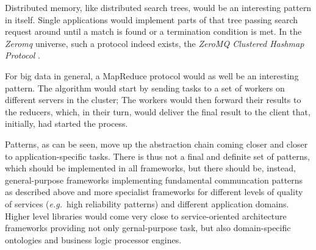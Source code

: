 \documentclass[a4paper]{scrartcl}
\newcommand\eg{\textit{e.g.}}
\newcommand{\term}[1]{\emph{#1}}
\newcommand{\connect}[2]{
\draw [->,color=black] (#1) to (#2)
}
\newcommand{\ancor}[2]{
\draw [-,color=green!30!black] (#1) to (#2)
}
\begin{document}
Distributed memory, like distributed search trees,
would be an interesting pattern in itself.
Single applications would implement parts of that tree
passing search request around until a match is found
or a termination condition is met.
In the \term{Zeromq} universe, such a protocol indeed exists,
the \term{ZeroMQ Clustered Hashmap Protocol} \cite{chp}.

For big data in general, a MapReduce protocol \cite{mapred} would
as well be an interesting pattern.
The algorithm would start by sending tasks to a set of workers
on different servers in the cluster;
The workers would then forward their results to the reducers,
which, in their turn, would deliver the final result
to the client that, initially, had started the process.

Patterns, as can be seen, move up the abstraction chain
coming closer and closer to application-specific tasks.
There is thus not a final and definite set of patterns,
which should be implemented in all frameworks,
but there should be, instead, general-purpose frameworks
implementing fundamental communcation patterns
as described above
and more specialist frameworks
for different levels of quality of services 
(\eg\ high reliability patterns)
and different application domains.
Higher level libraries would come very close
to service-oriented architecture frameworks
providing not only gernal-purpose task,
but also domain-specific ontologies 
and business logic processor engines.


\end{document}
